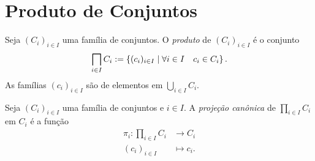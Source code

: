 \cleardoublepage
\section{Produto de Conjuntos}

   \begin{defi}
Seja $(C_i)_{i \in I}$ uma família de conjuntos. O \emph{produto} de $(C_i)_{i \in I}$ é o conjunto
	\begin{equation*}
	\prod_{i \in I} C_i := \set{(c_i)_{i \in I}}{\forall i \in I \quad c_i \in C_i}.
	\end{equation*}
As famílias $(c_i)_{i \in I}$ são de elementos em $\bigcup_{i \in I} C_i$.
\end{defi}

\begin{defi}
Seja $(C_i)_{i \in I}$ uma família de conjuntos e $i \in I$. A \emph{projeção canônica} de $\prod_{i \in I} C_i$ em $C_i$ é a função
	\begin{align*}
	\pi_i: \prod_{i \in I} C_i &\to C_i \\
			(c_i)_{i \in I} &\mapsto c_i.
	\end{align*}
\end{defi}

